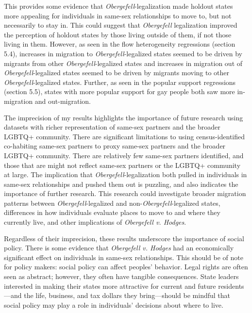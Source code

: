 \documentclass[12pt,letterpaper]{article}
\begin{document}
This provides some evidence that \textit{Obergefell}-legalization made holdout states more appealing for individuals in same-sex relationships to move to, but not necessarily to stay in. This could suggest that \textit{Obergefell} legalization improved the perception of holdout states by those living outside of them, if not those living in them. However, as seen in the flow heterogeneity regressions (section 5.4), increases in migration to \textit{Obergefell}-legalized states seemed to be driven by migrants from other \textit{Obergefell}-legalized states and increases in migration out of \textit{Obergefell}-legalized states seemed to be driven by migrants moving to other \textit{Obergefell}-legalized states. Further, as seen in the popular support regressions (section 5.5), states with more popular support for gay people both saw more in-migration and out-migration.

The imprecision of my results highlights the importance of future research using datasets with richer representation of same-sex partners and the broader LGBTQ+ community. There are significant limitations to using census-identified co-habiting same-sex partners to proxy same-sex partners and the broader LGBTQ+ community. There are relatively few same-sex partners identified, and those that are might not reflect same-sex partners or the LGBTQ+ community at large. The implication that \textit{Obergefell}-legalization both pulled in individuals in same-sex relationships and pushed them out is puzzling, and also indicates the importance of further research. This research could investigate broader migration patterns between \textit{Obergefell}-legalized and non-\textit{Obergefell}-legalized states, differences in how individuals evaluate places to move to and where they currently live, and other implications of \textit{Obergefell v. Hodges}. 

Regardless of their imprecision, these results underscore the importance of social policy. There is some evidence that \textit{Obergefell v. Hodges} had an economically significant effect on individuals in same-sex relationships. This should be of note for policy makers: social policy can affect peoples' behavior. Legal rights are often seen as abstract; however, they often have tangible consequences. State leaders interested in making their states more attractive for current and future residents---and the life, business, and tax dollars they bring---should be mindful that social policy may play a role in individuals' decisions about where to live. 
\end{document}
